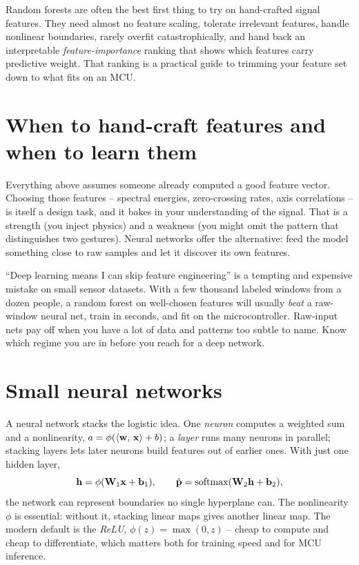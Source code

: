 \begin{aestheticbox}
Random forests are often the best first thing to try on hand-crafted signal
features. They need almost no feature scaling, tolerate irrelevant features,
handle nonlinear boundaries, rarely overfit catastrophically, and hand back an interpretable
\emph{feature-importance} ranking that shows which features carry predictive
weight. That ranking is a practical guide to trimming your feature set down to what fits on an MCU.
\end{aestheticbox}

\clearpage
\section{When to hand-craft features and when to learn them}
\label{ch39:features-vs-raw}

Everything above assumes someone already computed a good feature vector. Choosing those
features -- spectral energies, zero-crossing rates, axis correlations -- is itself a design
task, and it bakes in your understanding of the signal. That is a strength (you
inject physics) and a weakness (you might omit the pattern that distinguishes two
gestures). Neural networks offer the alternative: feed the model something close to raw
samples and let it discover its own features.

\begin{trapbox}
``Deep learning means I can skip feature engineering'' is a tempting and expensive
mistake on small sensor datasets. With a few thousand labeled windows from a dozen
people, a random forest on well-chosen features will usually \emph{beat} a raw-window
neural net, train in seconds, and fit on the microcontroller. Raw-input nets pay off
when you have a lot of data and patterns too subtle to name. Know which regime you are
in before you reach for a deep network.
\end{trapbox}

\section{Small neural networks}
\label{ch39:mlp}

A neural network stacks the logistic idea. One \emph{neuron} computes a weighted sum and
a nonlinearity, $a = \phi(\langle \mathbf{w},\, \mathbf{x} \rangle+b)$; a \emph{layer} runs many neurons
in parallel; stacking layers lets later neurons build features out of earlier ones. With
just one hidden layer,
\[
  \mathbf{h} = \phi(\mathbf{W}_1\mathbf{x} + \mathbf{b}_1), \qquad
  \hat{\mathbf{p}} = \mathrm{softmax}(\mathbf{W}_2\mathbf{h} + \mathbf{b}_2),
\]
the network can represent boundaries no single hyperplane can. The nonlinearity $\phi$ is
essential: without it, stacking linear maps gives another linear map. The modern
default is the \emph{ReLU}, $\phi(z)=\max(0,z)$ -- cheap to compute and cheap to
differentiate, which matters both for training speed and for MCU inference.

